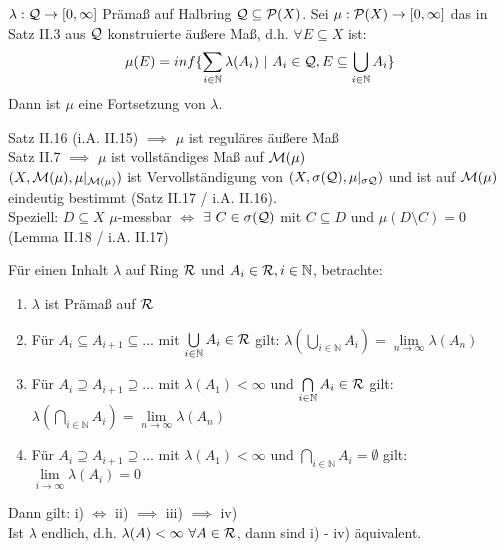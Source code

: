 \documentclass[11pt,a4paper,fleqn,openany]{report}
\begin{document}
    \begin{theorem}[(i.A. II.30)]
      $\lambda: \mathcal{Q} \to [0, \infty]$ Prämaß auf Halbring $\mathcal{Q} \subseteq \mathcal{P}(X)$. Sei $\mu:\mathcal{P}(X) \to [0,\infty]$ das in Satz II.3 aus $\mathcal{Q}$ konstruierte äußere Maß, d.h. $\forall E \subseteq X$ ist:
      \begin{align*}
        \mu(E) = inf\{\sum\limits_{i \in \mathbb{N}} \lambda(A_i) \ | \ A_i \in \script{Q}, E \subseteq \bigcup\limits_{i \in \mathbb{N}}A_i \}
      \end{align*}
      Dann ist $\mu$ eine Fortsetzung von $\lambda$.
    \end{theorem}

    \begin{remark}
      Satz II.16 (i.A. II.15) $\implies$ $\mu$ ist reguläres äußere Maß\\
      Satz II.7 $\implies$ $\mu$ ist vollständiges Maß auf $\mathcal{M}(\mu)$\\
      $(X, \mathcal{M}(\mu), \mu|_{\mathcal{M}(\mu)})$ ist Vervollständigung von $(X, \sigma(\mathcal{Q}), \mu|_{\sigma{\mathcal{Q}}})$ und ist auf $\mathcal{M}(\mu)$ eindeutig bestimmt (Satz II.17 / i.A. II.16).\\
      Speziell: $D \subseteq X$ $\mu$-messbar $\Leftrightarrow$ $\exists \ C \in \sigma(\mathcal{Q})$ mit $C \subseteq D$ und $\mu(D \setminus C) = 0$ (Lemma II.18 / i.A. II.17)
    \end{remark}

    \begin{theorem}[(i.A. II.31)]
      Für einen Inhalt $\lambda$ auf Ring $\mathcal{R}$ und $A_i \in \mathcal{R}, i \in \mathbb{N}$, betrachte:
      \begin{enumerate}[label=\roman*)]
        \item $\lambda$ ist Prämaß auf $\mathcal{R}$
        \item Für $A_i \subseteq A_{i+1} \subseteq ...$ mit $\bigcup\limits_{i \in \mathbb{N}} A_i \in \mathcal{R}$ gilt: $\lambda(\bigcup\limits_{i \in \mathbb{N}} A_i) = \lim\limits_{n \to \infty} \lambda(A_n)$
        \item Für $A_i \supseteq A_{i+1} \supseteq ...$ mit $\lambda(A_1) < \infty$ und $\bigcap\limits_{i \in \mathbb{N}} A_i \in \mathcal{R}$ gilt:\\
        $\lambda(\bigcap\limits_{i \in \mathbb{N}} A_i) = \lim\limits_{n \to \infty} \lambda(A_n)$
        \item Für $A_i \supseteq A_{i+1} \supseteq ...$ mit $\lambda(A_1) < \infty$ und $\bigcap\limits_{i \in \mathbb{N}} A_i = \emptyset$ gilt: $\lim\limits_{i \to \infty} \lambda(A_i) = 0$
      \end{enumerate} 
      Dann gilt: i) $\Leftrightarrow$ ii) $\implies$ iii) $\implies$ iv)\\
      Ist $\lambda$ endlich, d.h. $\lambda(A) < \infty \ \forall A \in \script{R}$, dann sind i) - iv) äquivalent.
    \end{theorem}
\end{document}
